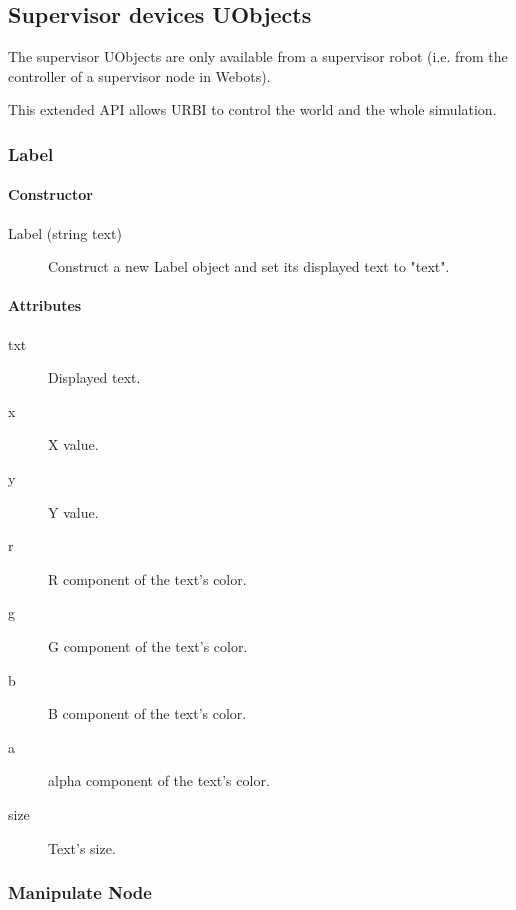 \subsection{Supervisor devices UObjects}
\label{webots.uobjects.supervisor}%

 The supervisor UObjects are only available from a supervisor
robot (i.e. from the controller of a supervisor node in Webots).


 This extended API allows URBI to control the world and the whole
simulation.


\subsubsection{Label}
\label{webots.uobjects.supervisor.label}%

\paragraph{Constructor}
\label{webots.uobjects.supervisor.label.constructor}%

\noindent
\begin{description}
\item[{Label (string text)}] Construct a new Label object and set its displayed text to "text".

\end{description}

\paragraph{Attributes}
\label{webots.uobjects.supervisor.label.attributes}%

\noindent
\begin{description}
\item[{txt}] Displayed text.
\item[{x}] X value.
\item[{y}] Y value.
\item[{r}] R component of the text's color.
\item[{g}] G component of the text's color.
\item[{b}] B component of the text's color.
\item[{a}] alpha component of the text's color.
\item[{size}] Text's size.
\end{description}

\subsubsection{Manipulate Node}
\label{webots.uobjects.supervisor.manipulatenode}%

